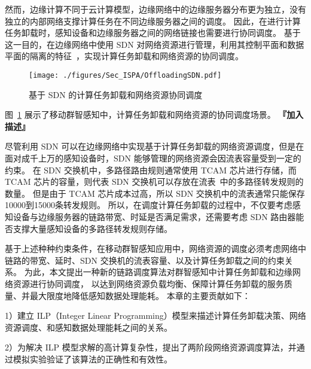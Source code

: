 然而，边缘计算不同于云计算模型，边缘网络中的边缘服务器分布更为独立，没有独立的内部网络支撑计算任务在不同边缘服务器之间的调度。
因此，在进行计算任务卸载时，感知设备和边缘服务器之间的网络链接也需要进行协同调度。
基于这一目的，在边缘网络中使用 SDN 对网络资源进行管理，利用其控制平面和数据平面的隔离的特征~\cite{Committee:2012un}，实现计算任务卸载和网络资源的协同调度。


\begin{figure}[!h]
  \centering
  \texttt{[image: ./figures/Sec\_ISPA/OffloadingSDN.pdf]}
  \vspace{-1em}
  \caption{基于 SDN 的计算任务卸载和网络资源协同调度}
  \vspace{-1em}
  \label{fig_OffloadingSDN}
\end{figure}

图~\ref{fig_OffloadingSDN} 展示了移动群智感知中，计算任务卸载和网络资源的协同调度场景。
\textbf{『加入描述』}

尽管利用 SDN 可以在边缘网络中实现基于计算任务卸载的网络资源调度，但是在面对成千上万的感知设备时，SDN 能够管理的网络资源会因流表容量受到一定的约束。
在 SDN 交换机中，多路径路由规则通常使用 TCAM 芯片进行存储，而 TCAM 芯片的容量，则代表 SDN 交换机可以存放在流表~\cite{Dasgupta:2012:DMD:2400771.2401550}中的多路径转发规则的数量。
但是由于 TCAM 芯片成本过高，所以 SDN 交换机中的流表通常只能保存10000到15000条转发规则。
所以，在调度计算任务卸载的过程中，不仅要考虑感知设备与边缘服务器的链路带宽、时延是否满足需求，还需要考虑 SDN 路由器能否支撑大量感知设备的多路径转发规则存储。

基于上述种种约束条件，在移动群智感知应用中，网络资源的调度必须考虑网络中链路的带宽、延时、SDN 交换机的流表容量、以及计算任务卸载之间的约束关系。
为此，本文提出一种新的链路调度算法对群智感知中计算任务卸载和边缘网络资源进行协同调度，
以达到网络资源负载均衡、保障计算任务卸载的服务质量、并最大限度地降低感知数据处理能耗。
本章的主要贡献如下：

1）建立 ILP（Integer Linear Programming）模型来描述计算任务卸载决策、网络资源调度、和感知数据处理能耗之间的关系。

2）为解决 ILP 模型求解的高计算复杂性，提出了两阶段网络资源调度算法，并通过模拟实验验证了该算法的正确性和有效性。

